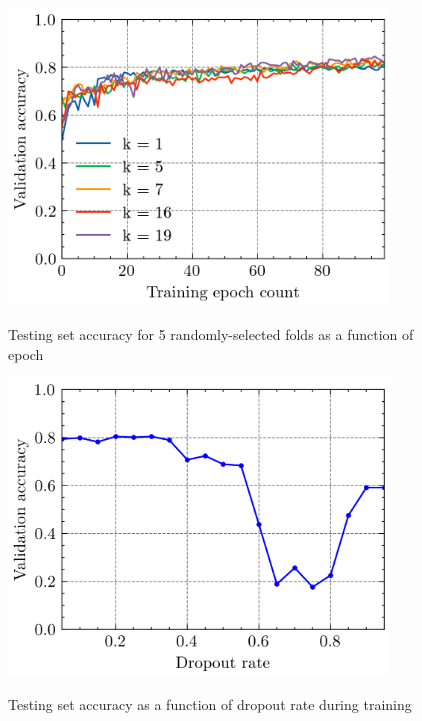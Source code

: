 \begin{figure}
    \centering
    \caption{Testing set accuracy for 5 randomly-selected folds as a function of epoch}
    \includegraphics[width=0.9\textwidth]{assets/acc_vs_epoch/acc_vs_epoch.png}
    \label{fig:acc_vs_epoch}
\end{figure}
\begin{figure}
    \centering
    \caption{Testing set accuracy as a function of dropout rate during training}
    \includegraphics[width=0.9\textwidth]{assets/acc_vs_dropout_rate/acc_vs_dropout_rate.png}
    \label{fig:dropout_rate}
\end{figure}
